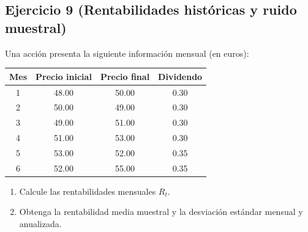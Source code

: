 \documentclass[12pt,a4paper]{article}
\newcommand{\E}{\mathbb{E}}
\newenvironment{ejercicio}[1]{\subsection*{Ejercicio #1}}{}
\begin{document}
\begin{ejercicio}{9 (Rentabilidades históricas y ruido muestral)}
Una acción presenta la siguiente información mensual (en euros):
\begin{center}
\begin{tabular}{c c c c}
\toprule
Mes & Precio inicial & Precio final & Dividendo \\
\midrule
1 & 48.00 & 50.00 & 0.30 \\
2 & 50.00 & 49.00 & 0.30 \\
3 & 49.00 & 51.00 & 0.30 \\
4 & 51.00 & 53.00 & 0.30 \\
5 & 53.00 & 52.00 & 0.35 \\
6 & 52.00 & 55.00 & 0.35 \\
\bottomrule
\end{tabular}
\end{center}
\begin{enumerate}[label=\alph*)]
  \item Calcule las rentabilidades mensuales $R_t$.
  \item Obtenga la rentabilidad media muestral y la desviación estándar mensual y anualizada.
\end{enumerate}
\end{ejercicio}



\end{document}

